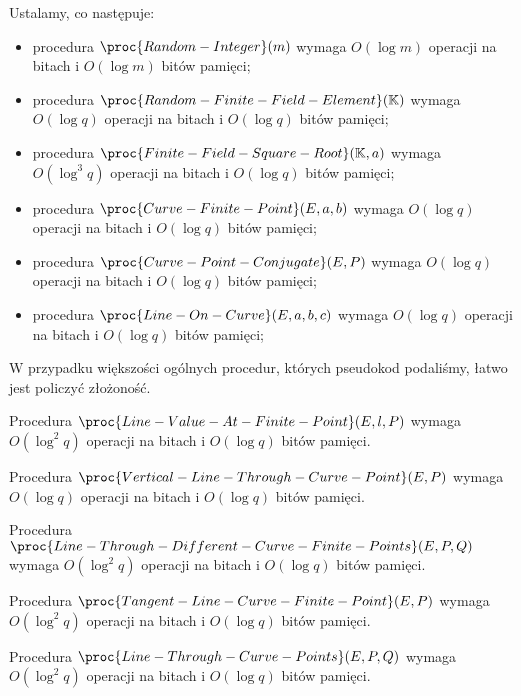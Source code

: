 \begin{remark}
Ustalamy, co następuje:
\begin{itemize}
\item
procedura $\proc{Random-Integer}(m)$ wymaga
$O(\log m)$ operacji na bitach i $O(\log m)$ bitów pamięci;
\item
procedura $\proc{Random-Finite-Field-Element}(\K)$ wymaga
$O(\log q)$ operacji na bitach i $O(\log q)$ bitów pamięci;
\item
procedura $\proc{Finite-Field-Square-Root}(\K, a)$ wymaga
$O(\log^3 q)$ operacji na bitach i $O(\log q)$ bitów pamięci;
\item
procedura $\proc{Curve-Finite-Point}(E, a, b)$ wymaga
$O(\log q)$ operacji na bitach i $O(\log q)$ bitów pamięci;
\item
procedura $\proc{Curve-Point-Conjugate}(E, P)$ wymaga
$O(\log q)$ operacji na bitach \linebreak i $O(\log q)$ bitów pamięci;
\item
procedura $\proc{Line-On-Curve}(E, a, b, c)$ wymaga
$O(\log q)$ operacji na bitach i $O(\log q)$ bitów pamięci;
\end{itemize}
\end{remark}

W przypadku większości ogólnych procedur, których pseudokod podaliśmy,
łatwo jest policzyć złożoność.

\begin{fact}
Procedura $\proc{Line-Value-At-Finite-Point}(E, l, P)$ wymaga
$O(\log^2 q)$ operacji na bitach i $O(\log q)$ bitów pamięci.
\end{fact}

\begin{fact}
Procedura $\proc{Vertical-Line-Through-Curve-Point}(E, P)$ wymaga
$O(\log q)$ operacji na bitach i $O(\log q)$ bitów pamięci.
\end{fact}

\begin{fact}
Procedura $\proc{Line-Through-Different-Curve-Finite-Points}(E, P, Q)$ wymaga
$O(\log^2 q)$ operacji na bitach i $O(\log q)$ bitów pamięci.
\end{fact}

\begin{fact}
Procedura $\proc{Tangent-Line-Curve-Finite-Point}(E, P)$ wymaga
$O(\log^2 q)$ operacji na bitach i $O(\log q)$ bitów pamięci.
\end{fact}

\begin{fact}
Procedura $\proc{Line-Through-Curve-Points}(E, P, Q)$ wymaga
$O(\log^2 q)$ operacji na bitach i $O(\log q)$ bitów pamięci.
\end{fact}

